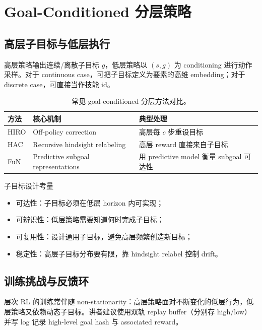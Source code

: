 \section{Goal-Conditioned 分层策略}

\subsection{高层子目标与低层执行}

高层策略输出连续/离散子目标 \(g\)，低层策略以 \((s, g)\) 为 conditioning 进行动作采样。对于 continuous case，可把子目标定义为要素的高维 embedding；对于 discrete case，可直接当作技能 id。

\begin{table}[H]
\centering
\begin{tabular}{p{3cm}p{5cm}p{4cm}}
\toprule
方法 & 核心机制 & 典型处理 \\
\midrule
HIRO & Off-policy correction & 高层每 $c$ 步重设目标 \\
HAC & Recursive hindsight relabeling & 高层 reward 直接来自子目标 \\
FuN & Predictive subgoal representations & 用 predictive model 衡量 subgoal 可达性 \\
\bottomrule
\end{tabular}
\caption{常见 goal-conditioned 分层方法对比。}
\end{table}

\begin{knowledgebox}{子目标设计考量}
\begin{itemize}
    \item 可达性：子目标必须在低层 horizon 内可实现；
    \item 可辨识性：低层策略需要知道何时完成子目标；
    \item 可复用性：设计通用子目标，避免高层频繁创造新目标；
    \item 稳定性：高层子目标分布要有限，靠 hindsight relabel 控制 drift。
\end{itemize}
\end{knowledgebox}

\subsection{训练挑战与反馈环}

层次 RL 的训练常伴随 non-stationarity：高层策略面对不断变化的低层行为，低层策略又依赖动态子目标。讲者建议使用双轨 replay buffer（分别存 high/low）并写 log 记录 high-level goal hash 与 associated reward。

